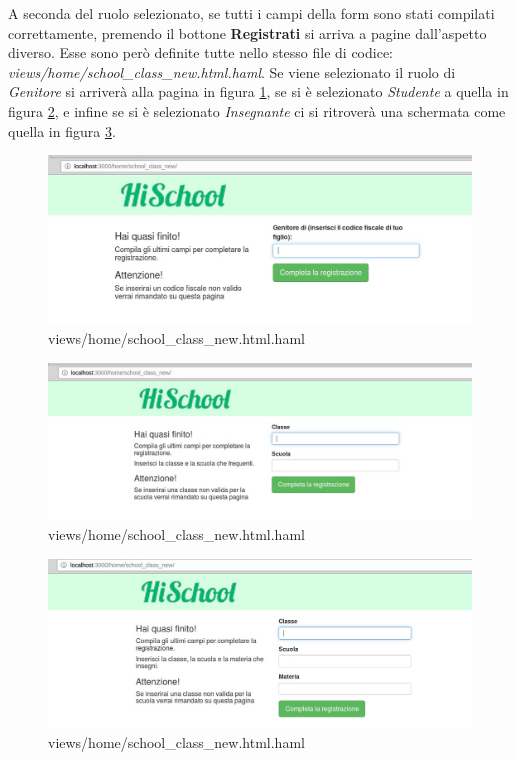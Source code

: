 \documentclass[Lau, binding=0.6cm, oneside]{sapthesis}
\begin{document}
A seconda del ruolo selezionato, se tutti i campi della form sono stati compilati correttamente, premendo il bottone \textbf{Registrati} si arriva a pagine dall'aspetto diverso. Esse sono però definite tutte nello stesso file di codice: \textit{views/home/school\_class\_new.html.haml}. 
Se viene selezionato il ruolo di \textit{Genitore} si arriverà alla pagina in figura \ref{fig:school_p_form}, se si è selezionato \textit{Studente}      a quella in figura \ref{fig:school_s_form}, e infine se si è selezionato \textit{Insegnante} ci si ritroverà una schermata come quella in figura \ref{fig:school_t_form}.

\begin{figure}[H]
	\centering
	\includegraphics[width=1\linewidth]{images/school_p_form} 
	\caption{views/home/school\_class\_new.html.haml}
	\label{fig:school_p_form}
\end{figure}

\begin{figure}[H]
	\centering
	\includegraphics[width=1\linewidth]{images/school_s_form} 
	\caption{views/home/school\_class\_new.html.haml}
	\label{fig:school_s_form}
\end{figure}

\begin{figure}[H]
	\centering
	\includegraphics[width=1\linewidth]{images/school_t_form} 
	\caption{views/home/school\_class\_new.html.haml}
	\label{fig:school_t_form}
\end{figure}
\end{document}
